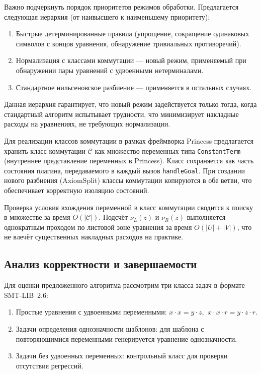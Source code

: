 \documentclass[14pt, russian]{scrartcl}
\begin{document}
Важно подчеркнуть порядок приоритетов режимов обработки. Предлагается следующая
иерархия (от наивысшего к наименьшему приоритету):
\begin{enumerate}
\item Быстрые детерминированные правила (упрощение, сокращение одинаковых
  символов с концов уравнения, обнаружение тривиальных противоречий).
\item Нормализация с классами коммутации --- новый режим, применяемый при
  обнаружении пары уравнений с удвоенными нетерминалами.
\item Стандартное нильсеновское разбиение --- применяется в остальных случаях.
\end{enumerate}

Данная иерархия гарантирует, что новый режим задействуется только тогда,
когда стандартный алгоритм испытывает трудности, что минимизирует накладные
расходы на уравнениях, не требующих нормализации.

Для реализации классов коммутации в рамках фреймворка Princess предлагается
хранить класс коммутации $\mathcal{C}$ как множество переменных типа
\texttt{ConstantTerm} (внутреннее представление переменных в Princess).
Класс сохраняется как часть состояния плагина, передаваемого в каждый вызов
\texttt{handleGoal}. При создании нового разбиения (AxiomSplit) классы
коммутации копируются в обе ветви, что обеспечивает корректную изоляцию
состояний.

Проверка условия вхождения переменной в класс коммутации сводится к поиску
в множестве за время $O(|\mathcal{C}|)$. Подсчёт $\nu_L(z)$ и $\nu_R(z)$
выполняется однократным проходом по листовой зоне уравнения за время
$O(|U| + |V|)$, что не влечёт существенных накладных расходов на практике.

\subsection{Анализ корректности и завершаемости}

Для оценки предложенного алгоритма рассмотрим три класса задач в формате
SMT-LIB~2.6:

\begin{enumerate}
\item Простые уравнения с удвоенными переменными:
  $x \cdot x = y \cdot z$, $\ x \cdot x \cdot r = y \cdot z \cdot r$.
\item Задачи определения однозначности шаблонов: для шаблона с повторяющимися
  переменными генерируется уравнение однозначности.
\item Задачи без удвоенных переменных: контрольный класс для проверки
  отсутствия регрессий.
\end{enumerate}
\end{document}
